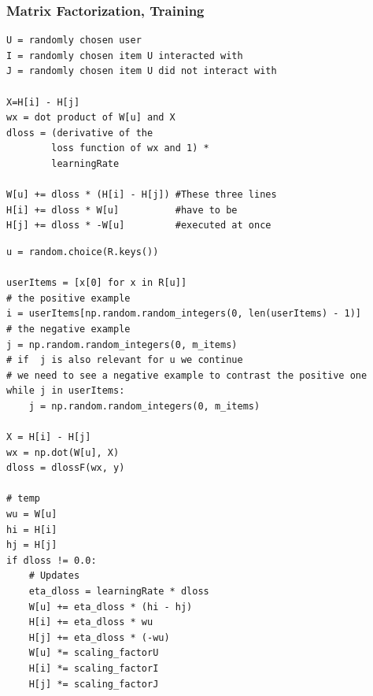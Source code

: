 \documentclass[mathserif,svgnames]{beamer}
\newcommand\marktopleft[1]{%
    \tikz[overlay,remember picture] 
    \node (marker-#1-a) at (0,1.5ex) {};%
}
\newcommand\markbottomright[2][red]{%
    \tikz[overlay,remember picture] 
    \node (marker-#2-b) at (0,0) {};%
    \tikz[overlay,remember picture,thick,inner sep=3pt,fill=red]
    \node[draw,rectangle,fill=#1,nearly transparent,fit=(marker-#2-a.center) (marker-#2-b.center)] {};%
}
\begin{document}
\begin{frame}[fragile]
    \frametitle{Matrix Factorization, Training}
\begin{lstlisting}[style=pseudocode]
U = randomly chosen user
I = randomly chosen item U interacted with
J = randomly chosen item U did not interact with

X=H[i] - H[j]
wx = dot product of W[u] and X
dloss = (derivative of the 
        loss function of wx and 1) * 
        learningRate
        
W[u] += dloss * (H[i] - H[j]) #These three lines
H[i] += dloss * W[u]          #have to be
H[j] += dloss * -W[u]         #executed at once
\end{lstlisting}
\end{frame}

\begin{frame}[fragile]
\beamertemplatenavigationsymbolsempty
\begin{lstlisting}[style=python]
u = random.choice(R.keys())

userItems = [x[0] for x in R[u]]
# the positive example
i = userItems[np.random.random_integers(0, len(userItems) - 1)]
# the negative example
j = np.random.random_integers(0, m_items)
# if  j is also relevant for u we continue
# we need to see a negative example to contrast the positive one
while j in userItems:
    j = np.random.random_integers(0, m_items)

X = H[i] - H[j]
wx = np.dot(W[u], X)
dloss = dlossF(wx, y)

# temp
wu = W[u]
hi = H[i]
hj = H[j]
if dloss != 0.0:
    # Updates
    eta_dloss = learningRate * dloss
    W[u] += eta_dloss * (hi - hj)
    H[i] += eta_dloss * wu
    H[j] += eta_dloss * (-wu)
    W[u] *= scaling_factorU
    H[i] *= scaling_factorI
    H[j] *= scaling_factorJ
\end{lstlisting}
\end{frame}
%
\end{document}
